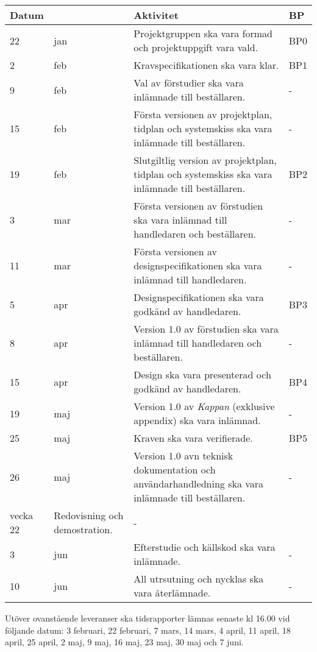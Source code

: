 \documentclass[11pt]{article}
\begin{document}
\begin{flushleft}
\begin{center}
\begin{longtable}{|p{.02\linewidth} p{.08\linewidth} | p{.8\linewidth} | p{.1\linewidth} |} \hline
\textbf{Datum} & & \textbf{Aktivitet} & \textbf{BP} \\ \hline
22 & jan & Projektgruppen ska vara formad och projektuppgift vara vald. & BP0 \\ \hline
2 & feb & Kravspecifikationen ska vara klar. & BP1 \\ \hline
9 & feb & Val av förstudier ska vara inlämnade till beställaren. & - \\ \hline
15 & feb & Första versionen av projektplan, tidplan och systemskiss ska vara inlämnade till beställaren. & - \\ \hline
19 & feb & Slutgiltlig version av projektplan, tidplan och systemskiss ska vara inlämnade till beställaren.& BP2 \\ \hline
3 & mar & Första versionen av förstudien ska vara inlämnad till handledaren och beställaren. & - \\ \hline
11 & mar & Första versionen av designspecifikationen ska vara inlämnad till handledaren. & - \\ \hline
5 & apr & Designspecifikationen ska vara godkänd av handledaren. & BP3 \\ \hline
8 & apr & Version 1.0 av förstudien ska vara inlämnad till handledaren och beställaren. & - \\ \hline
15 & apr & Design ska vara presenterad och godkänd av handledaren. & BP4 \\ \hline
19 & maj & Version 1.0 av \textit{Kappan} (exklusive appendix) ska vara inlämnad. & - \\ \hline
25 & maj & Kraven ska vara verifierade.  & BP5 \\ \hline
26 & maj & Version 1.0 avn teknisk dokumentation och användarhandledning ska vara inlämnade till beställaren. & - \\ \hline
vecka  22 &  Redovisning och demostration. & - \\ \hline
3 & jun & Efterstudie och källskod ska vara inlämnade. & - \\ \hline
10 & jun & All utrsutning och nycklas ska vara återlämnade. & - \\ \hline
\end{longtable}
\end{center}

Utöver ovanstående leveranser ska tidsrapporter lämnas senaste kl 16.00 vid följande datum: 3 februari, 22 februari, 7 mars, 14 mars, 4 april, 11 april, 18 april, 25 april, 2 maj, 9 maj, 16 maj, 23 maj, 30 maj och 7 juni. 


\end{flushleft}
\end{document}
